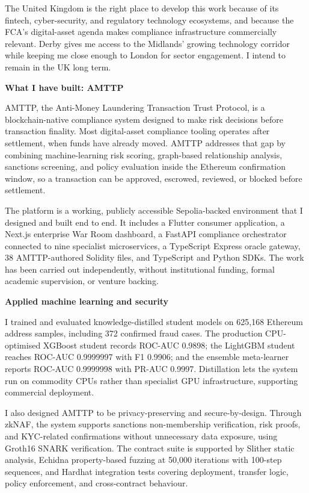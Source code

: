 \documentclass[12pt,a4paper]{article}
\begin{document}
The United Kingdom is the right place to develop this work because of its fintech, cyber-security, and regulatory technology ecosystems, and because the FCA's digital-asset agenda makes compliance infrastructure commercially relevant. Derby gives me access to the Midlands' growing technology corridor while keeping me close enough to London for sector engagement. I intend to remain in the UK long term.

\textbf{What I have built: AMTTP}

AMTTP, the Anti-Money Laundering Transaction Trust Protocol, is a blockchain-native compliance system designed to make risk decisions before transaction finality. Most digital-asset compliance tooling operates after settlement, when funds have already moved. AMTTP addresses that gap by combining machine-learning risk scoring, graph-based relationship analysis, sanctions screening, and policy evaluation inside the Ethereum confirmation window, so a transaction can be approved, escrowed, reviewed, or blocked before settlement.

The platform is a working, publicly accessible Sepolia-backed environment that I designed and built end to end. It includes a Flutter consumer application, a Next.js enterprise War Room dashboard, a FastAPI compliance orchestrator connected to nine specialist microservices, a TypeScript Express oracle gateway, 38 AMTTP-authored Solidity files, and TypeScript and Python SDKs. The work has been carried out independently, without institutional funding, formal academic supervision, or venture backing.

\textbf{Applied machine learning and security}

I trained and evaluated knowledge-distilled student models on 625{,}168 Ethereum address samples, including 372 confirmed fraud cases. The production CPU-optimised XGBoost student records ROC-AUC 0.9898; the LightGBM student reaches ROC-AUC 0.9999997 with F1 0.9906; and the ensemble meta-learner reports ROC-AUC 0.9999998 with PR-AUC 0.9997. Distillation lets the system run on commodity CPUs rather than specialist GPU infrastructure, supporting commercial deployment.

I also designed AMTTP to be privacy-preserving and secure-by-design. Through zkNAF, the system supports sanctions non-membership verification, risk proofs, and KYC-related confirmations without unnecessary data exposure, using Groth16 SNARK verification. The contract suite is supported by Slither static analysis, Echidna property-based fuzzing at 50{,}000 iterations with 100-step sequences, and Hardhat integration tests covering deployment, transfer logic, policy enforcement, and cross-contract behaviour.
\end{document}
